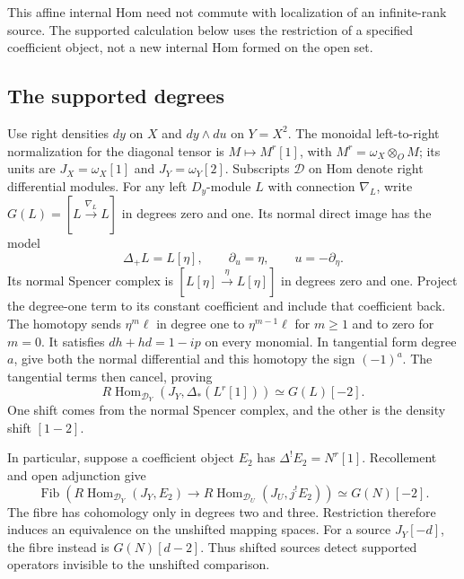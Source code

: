 This affine internal Hom need not commute with localization of an
infinite-rank source. The supported calculation below uses the
restriction of a specified coefficient object, not a new internal
Hom formed on the open set.

\subsection{The supported degrees}

Use right densities $dy$ on $X$ and $dy\wedge du$ on $Y=X^2$.
The monoidal left-to-right normalization for the diagonal tensor is
$M\mapsto M^r[1]$, with $M^r=\omega_X\otimes_OM$; its units are
$J_X=\omega_X[1]$ and $J_Y=\omega_Y[2]$.
Subscripts $\mathcal D$ on Hom denote right differential modules.
For any left $D_y$-module $L$ with connection $\nabla_L$, write
$G(L)=[L\xrightarrow{\nabla_L}L]$ in degrees zero and one.
Its normal direct image has the model
\[
 \Delta_+L=L[\eta],\qquad \partial_u=\eta,\qquad
 u=-\partial_\eta.
\]
Its normal Spencer complex is
$[L[\eta]\xrightarrow{\eta}L[\eta]]$ in degrees zero and one.
Project the degree-one term to its constant coefficient and include
that coefficient back. The homotopy sends $\eta^m\ell$ in degree
one to $\eta^{m-1}\ell$ for $m\geq1$ and to zero for $m=0$.
It satisfies $dh+hd=1-ip$ on every monomial. In tangential form
degree $a$, give both the normal differential and this homotopy
the sign $(-1)^a$. The tangential terms then cancel, proving
\begin{equation}\label{eq:vol2-affine-supported-hom}
 R\operatorname{Hom}_{\mathcal D_Y}
       (J_Y,\Delta_*(L^r[1]))\simeq G(L)[-2].
\end{equation}
One shift comes from the normal Spencer complex, and the other is
the density shift $[1-2]$.

In particular, suppose a coefficient object $E_2$ has
$\Delta^!E_2=N^r[1]$. Recollement and open adjunction give
\begin{equation}\label{eq:vol2-affine-restriction-fibre}
 \operatorname{Fib}\left(
 R\operatorname{Hom}_{\mathcal D_Y}(J_Y,E_2)
 \longrightarrow R\operatorname{Hom}_{\mathcal D_U}(J_U,j^!E_2)
 \right)\simeq G(N)[-2].
\end{equation}
The fibre has cohomology only in degrees two and three. Restriction
therefore induces an equivalence on the unshifted mapping spaces.
For a source $J_Y[-d]$, the fibre instead is $G(N)[d-2]$.
Thus shifted sources detect supported operators invisible to the
unshifted comparison.

